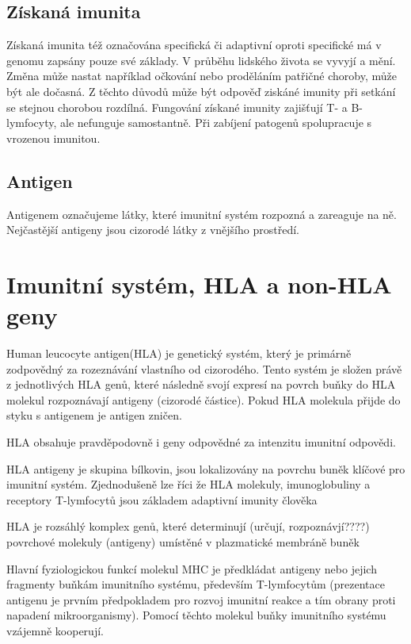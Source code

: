 \documentclass[czech,DP]{thesiskiv}
\begin{document}
\subsection{Získaná imunita}
Získaná imunita též označována specifická či adaptivní oproti specifické má v genomu zapsány pouze své základy. V průběhu lidského života se vyvyjí a mění. Změna může nastat například očkování nebo proděláním patřičné choroby, může být ale dočasná. Z těchto důvodů může být odpověď ziskáné imunity při setkání se stejnou chorobou rozdílná. Fungování získané imunity zajišťují T- a B- lymfocyty, ale nefunguje samostantně. Při zabíjení patogenů spolupracuje s vrozenou imunitou.

\subsection{Antigen}
Antigenem označujeme látky, které imunitní systém rozpozná a zareaguje na ně. Nejčastější antigeny jsou cizorodé látky z vnějšího prostředí.






\section{Imunitní systém, HLA a non-HLA geny}
Human leucocyte antigen(HLA) je genetický systém, který je primárně zodpovědný za rozeznávání vlastního od cizorodého. Tento systém je složen právě z jednotlivých HLA genů, které následně svojí expresí na povrch buňky do HLA molekul rozpoznávají antigeny (cizorodé částice). Pokud HLA molekula přijde do styku s antigenem je antigen zničen.

HLA obsahuje pravděpodovně i geny odpovědné za intenzitu imunitní odpovědi.


HLA antigeny je skupina bílkovin, jsou lokalizovány na povrchu buněk klíčové pro imunitní systém.
Zjednodušeně lze říci že HLA molekuly, imunoglobuliny a receptory T-lymfocytů jsou základem adaptivní imunity člověka

HLA je rozsáhlý komplex genů, které determinují (určují, rozpoznávjí????) povrchové molekuly (antigeny) umístěné v plazmatické membráně buněk

Hlavní fyziologickou funkcí molekul MHC je předkládat antigeny nebo jejich fragmenty buňkám imunitního systému, především T-lymfocytům (prezentace antigenu je prvním předpokladem pro rozvoj imunitní reakce a tím obrany proti napadení mikroorganismy). Pomocí těchto molekul buňky imunitního systému vzájemně kooperují.
\end{document}
